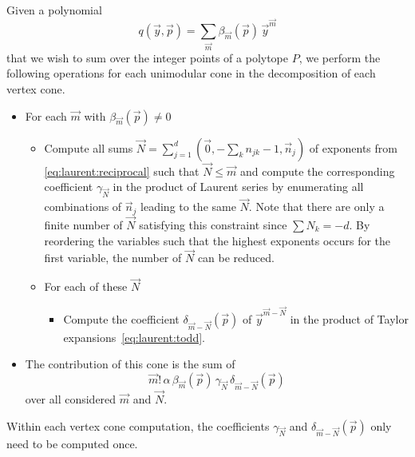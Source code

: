 Given a polynomial
$$
q(\vec y, \vec p) = \sum_{\vec m} \beta_{\vec m}(\vec p) \, \vec y^{\vec m}
$$
that we wish to sum over the integer points of a polytope $P$, we perform
the following operations for each unimodular cone in the decomposition
of each vertex cone.
\begin{itemize}
\item For each $\vec m$ with $\beta_{\vec m}(\vec p) \ne 0$
\begin{itemize}
\item Compute all sums
$\vec N = \sum_{j=1}^d (\vec 0, -\sum_k n_{jk}-1, \vec n_j)$
of exponents from \eqref{eq:laurent:reciprocal} such that
$\vec N \le \vec m$ and compute the corresponding coefficient $\gamma_{\vec N}$
in the product of Laurent series by enumerating all combinations
of $\vec n_j$ leading to the same $\vec N$.
Note that there are only a finite number of $\vec N$ satisfying this constraint
since $\sum N_k = -d$.
By reordering the variables such that the highest exponents occurs
for the first variable, the number of $\vec N$ can be reduced.
\item For each of these $\vec N$
\begin{itemize}
\item Compute the coefficient $\delta_{\vec m - \vec N}(\vec p)$ of
$\vec y^{\vec m - \vec N}$ in the product of
Taylor expansions~\eqref{eq:laurent:todd}.
\end{itemize}
\end{itemize}
\item The contribution of this cone is the sum of
$$
\vec m! \, \alpha \, \beta_{\vec m}(\vec p) \, \gamma_{\vec N} \,
		\delta_{\vec m - \vec N}(\vec p)
$$
over all considered $\vec m$ and $\vec N$.
\end{itemize}
Within each vertex cone computation, the coefficients
$\gamma_{\vec N}$ and $\delta_{\vec m - \vec N}(\vec p)$
only need to be computed once.

